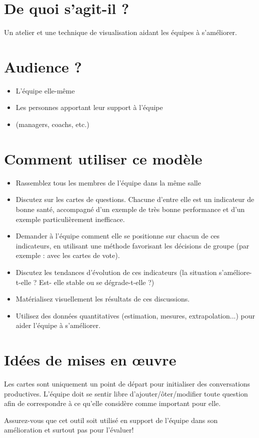 \documentclass[10pt]{article}
\begin{document}
\begin{minipage}{0.6\linewidth}
\section*{De quoi s’agit-il ?}
Un atelier et une technique de visualisation aidant les équipes à s’améliorer.

\section*{Audience ?}
\begin{itemize}
  \item L’équipe elle-même
  \item Les personnes apportant leur support à l’équipe
  \item (managers, coachs, etc.)
\end{itemize}


\section*{Comment utiliser ce modèle}
\begin{itemize}
  \item Rassemblez tous les membres de l’équipe dans la même salle
  \item Discutez sur les cartes de questions. Chacune d’entre elle est un indicateur de bonne santé, accompagné d’un exemple de très bonne performance et d’un exemple particulièrement inefficace.
  \item Demander à l’équipe comment elle se positionne sur chacun de ces indicateurs, en utilisant une méthode favorisant les décisions de groupe (par exemple : avec les cartes de vote).
  \item Discutez les tendances d’évolution de ces indicateurs (la situation s’améliore-t-elle ? Est- elle stable ou se dégrade-t-elle ?)
  \item Matérialisez visuellement les résultats de ces discussions.
  \item Utilisez des données quantitatives (estimation, mesures, extrapolation...) pour aider l’équipe à s’améliorer.
\end{itemize}


\section*{Idées de mises en œuvre}
  Les cartes sont uniquement un point de départ pour initialiser des conversations productives. L’équipe doit se sentir libre d’ajouter/ôter/modifier toute question afin de correspondre à ce qu’elle considère comme important pour elle.

  Assurez-vous que cet outil soit utilisé en support de l’équipe dans son amélioration et surtout pas pour l’évaluer!
\end{minipage} \hfill
\end{document}
